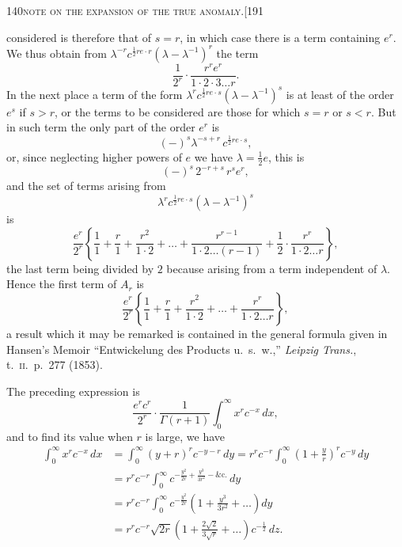 \documentclass[11pt]{article}
\begin{document}
\begin{center}\small\textsc{140}\hfill\textsc{note on the expansion of the true anomaly.}\hfill[191\end{center}

\noindent considered is therefore that of $s = r$, in which case there is a term containing $e^{r}$. We
thus obtain from $\lambda^{-r} c^{\frac{1}{2}r e \cdot r}(\lambda - \lambda^{-1})^{r}$ the term
\[
\frac{1}{2^{r}}\cdot\frac{r^{r} e^{r}}{1\cdot 2\cdot 3\ldots r}.
\]
In the next place a term of the form $\lambda^{r} c^{\frac{1}{2}r e \cdot s}(\lambda - \lambda^{-1})^{s}$ is at least of the order $e^{s}$
if $s > r$, or the terms to be considered are those for which $s = r$ or $s < r$. But in such
term the only part of the order $e^{r}$ is
\[
(-)^{s}\lambda^{-s+r}\, c^{\frac{1}{2}r e \cdot s},
\]
or, since neglecting higher powers of $e$ we have $\lambda = \tfrac{1}{2}e$, this is
\[
(-)^{s}\, 2^{-r+s}\, r^{s} e^{r},
\]
and the set of terms arising from
\[
\lambda^{r} c^{\frac{1}{2}r e \cdot s}(\lambda - \lambda^{-1})^{s}
\]
is
\[
\frac{e^{r}}{2^{r}}\left\{\frac{1}{1} + \frac{r}{1} + \frac{r^{2}}{1\cdot 2} + \ldots + \frac{r^{r-1}}{1\cdot 2\ldots(r-1)} + \frac{1}{2}\cdot\frac{r^{r}}{1\cdot 2\ldots r}\right\},
\]
the last term being divided by $2$ because arising from a term independent of $\lambda$.
Hence the first term of $A_{r}$ is
\[
\frac{e^{r}}{2^{r}}\left\{\frac{1}{1} + \frac{r}{1} + \frac{r^{2}}{1\cdot 2} + \ldots + \frac{r^{r}}{1\cdot 2\ldots r}\right\},
\]
a result which it may be remarked is contained in the general formula given in
Hansen's Memoir ``Entwickelung des Products u.\ s.\ w.,'' \textit{Leipzig Trans.}, t.\ \textsc{ii}.\ p.\ 277 (1853).

The preceding expression is
\[
\frac{e^{r} c^{r}}{2^{r}}\cdot\frac{1}{\Gamma(r+1)}\int_{0}^{\infty} x^{r} c^{-x}\, dx,
\]
and to find its value when $r$ is large, we have
\[
\begin{aligned}
\int_{0}^{\infty} x^{r} c^{-x}\, dx &= \int_{0}^{\infty}(y + r)^{r} c^{-y-r}\, dy = r^{r} c^{-r}\int_{0}^{\infty}\left(1 + \frac{y}{r}\right)^{r} c^{-y}\, dy\\
&= r^{r} c^{-r}\int_{0}^{\infty} c^{-\frac{y^{2}}{2r} + \frac{y^{3}}{3r^{2}} - \&\text{c.}}\, dy\\
&= r^{r} c^{-r}\int_{0}^{\infty} c^{-\frac{y^{2}}{2r}}\left(1 + \frac{y^{3}}{3r^{2}} + \ldots\right) dy\\
&= r^{r} c^{-r}\sqrt{2r}\left(1 + \frac{2\sqrt{2}}{3\sqrt{r}} + \ldots\right) c^{-\frac{1}{2}}\, dz.
\end{aligned}
\]
\end{document}
